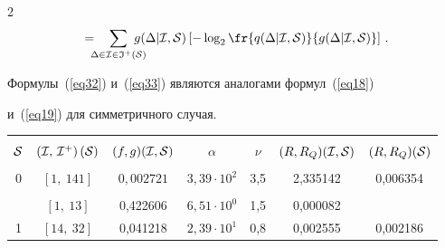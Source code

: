 \begin{multicols}{2}
\begin{multline}
{}=\hspace*{-2mm}

\sum\limits_{\Delta\in{\cal I}\in{\frak I}^+({\cal S)}}\hspace*{-4mm}

g(\Delta|{\cal I},{\cal S})

\left[-\log_{2}\fr{q(\Delta|{\cal I},{\cal S})}{g(\Delta|{\cal I},{\cal S})}\right]\,.

\end{multline}

Формулы~(\ref{eq32}) и~(\ref{eq33}) являются аналогами формул~(\ref{eq18}) 

и~(\ref{eq19}) для симметричного случая.




\begin{table}\small

\begin{center}


\label{tab3}

\vspace*{2ex}



\begin{tabular}{|c|c|c|c|c|c|c|}

\hline

&&&&&&\\[-11pt]

${\cal S}$ & $({\cal I},\,{\cal I}^+)\,({\cal S})$ & 

$(f,g)({\cal I},{\cal S})$ & $\alpha$ & $\nu$ & $(R,R_Q)({\cal I},{\cal S})$ &

$(R,R_Q)({\cal S})$ \\

\hline

&&&&&&\\[-9pt]

         0 & $[1,~141]$ & $0{,}002721$ & $3,{3}9\cdot10^2$ & 3,5 & 2,335142 & 0,006354 \\

\hline

&&&&&&\\[-9pt]

 & $[1,~13]$ & 0,422606 & $6{,}51\cdot10^0$ & 1,5 & 0,000082 &  \\

1           & $[14,~32]$ & 0,041218 & $2{,}39\cdot10^1$ & 0,8 & 0,002555 &{0,002186}\\


\end{tabular}
\end{center}
\end{table}
\end{multicols}
